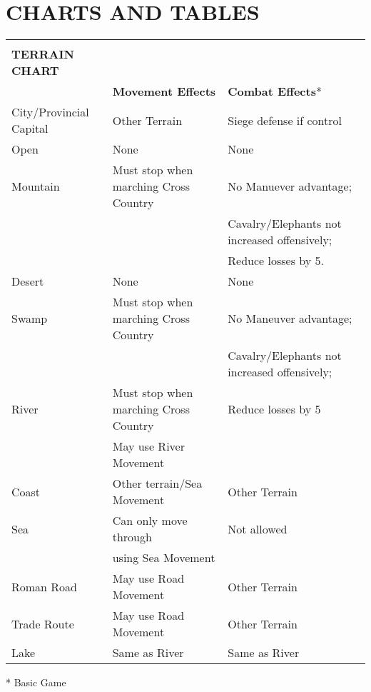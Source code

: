 \clearpage
\section{CHARTS AND TABLES}

\begin{tabular}{|lll|}
  \hline & &\\[-2.0ex]
  \textbf{TERRAIN CHART} & &\\
  & \textbf{Movement Effects} & \textbf{Combat Effects}*\\
  City/Provincial Capital & Other Terrain & Siege defense if control\\
  \rowcolor{BabyBlue}Open & None & None\\
  Mountain & Must stop when marching Cross Country & No Manuever advantage;\\
  & & Cavalry/Elephants not increased offensively;\\
  & & Reduce losses by 5.\\
  \rowcolor{BabyBlue}Desert & None & None\\
  Swamp & Must stop when marching Cross Country & No Maneuver advantage;\\
  & & Cavalry/Elephants not increased offensively;\\
  \rowcolor{BabyBlue}River & Must stop when marching Cross Country & Reduce losses by 5\\
  \rowcolor{BabyBlue}& May use River Movement &\\
  Coast & Other terrain/Sea Movement & Other Terrain\\
  \rowcolor{BabyBlue}Sea & Can only move through & Not allowed\\
  \rowcolor{BabyBlue}& using Sea Movement &\\
  Roman Road & May use Road Movement & Other Terrain\\
  \rowcolor{BabyBlue}Trade Route & May use Road Movement & Other Terrain\\
  Lake & Same as River & Same as River\\
  \hline
\end{tabular}

* Basic Game

\bigskip

